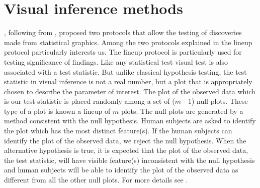 \documentclass[12]{article}
\begin{document}
%
%
%
%
%
%

\section{Visual inference methods} \label{sec:inference}

\cite{buja:2009}, following from \cite{gelman:2004}, proposed two protocols that allow the testing of discoveries made from statistical graphics. Among the two protocols explained in \cite{buja:2009} the lineup protocol particularly interests us. The lineup protocol is particularly used for testing significance of findings. Like any statistical test visual test is also associated with a test statistic. But unlike classical hypothesis testing, the test statistic in visual inference is not a real number, but a plot that is appropriately chosen to describe the parameter of interest. The plot of the observed data which is our test statistic is placed randomly among a set of ($m$ - 1) null plots. These type of a plot is known a lineup  of $m$ plots. The null plots are generated by a method consistent with the null hypothesis. Human subjects are asked to identify the plot which has the most distinct feature(s). If the human subjects can identify the plot of the observed data, we reject the null hypothesis. When the alternative hypothesis is true, it is expected that the plot of the observed data, the test statistic, will have visible feature(s) inconsistent with the null hypothesis and human subjects will be able to identify the plot of the observed data as different from all the other null plots. For more details see \cite{buja:2009}. 
\end{document}
